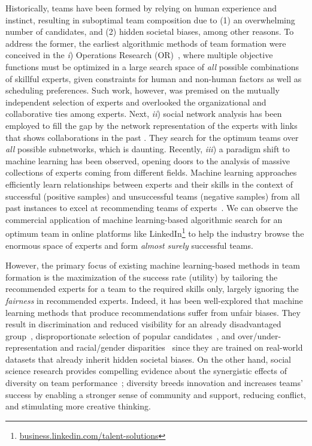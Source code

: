 \documentclass[runningheads]{llncs}
\begin{document}
Historically, teams have been formed by relying on human experience and instinct, resulting in suboptimal team composition due to (1) an overwhelming number of candidates, and (2) hidden societal biases, among other reasons. To address the former, the earliest algorithmic methods of team formation were conceived in the \textit{i}) Operations Research (OR)~\cite{RAHMANNIYAY2019153}, where multiple objective functions must be optimized in a large search space of \textit{all} possible combinations of skillful experts, given constraints for human and non-human factors as well as scheduling preferences. Such work, however, was premised on the mutually independent selection of experts and overlooked the organizational and collaborative ties among experts. Next, \textit{ii}) social network analysis has been employed to fill the gap by the network representation of the experts with links that shows collaborations in the past \cite{DBLP:conf/kdd/LappasLT09,kargar2011discovering,6228185}.  They search for the optimum teams over \textit{all} possible subnetworks, which is daunting. Recently, \textit{iii}) a paradigm shift to machine learning has been observed, opening doors to the analysis of massive collections of experts coming from different fields. Machine learning approaches efficiently learn relationships between experts and their skills in the context of successful (positive samples) and unsuccessful teams (negative samples) from all past instances to excel at recommending teams of experts~\cite{DBLP:conf/cikm/RadMFKSB21,DBLP:conf/cikm/DashtiSF22,DBLP:conf/cikm/RadFKSB20}. We can observe the commercial application of machine learning-based algorithmic search for an optimum team in online platforms like LinkedIn\footnote{\href{https://business.linkedin.com/talent-solutions}{business.linkedin.com/talent-solutions}} to help the industry browse the enormous space of experts and form \textit{almost surely} successful teams.

However, the primary focus of existing machine learning-based methods in team formation is the maximization of the success rate (utility) by tailoring the recommended experts for a team to the required skills only, largely ignoring the \textit{fairness} in recommended experts. Indeed, it has been well-explored that machine learning methods that produce recommendations suffer from unfair biases. They result in discrimination and reduced visibility for an already disadvantaged group~\cite{DBLP:conf/innovations/DworkHPRZ12,DBLP:conf/kdd/HajianBC16}, disproportionate selection of popular candidates~\cite{DBLP:journals/ipm/YalcinB21,DBLP:conf/kdd/Zhu0ZC21,DBLP:conf/kdd/SunGZZRHGTYHC20}, and over/under-representation and racial/gender disparities~\cite{DBLP:conf/chi/KayMM15} since they are trained on real-world datasets that already inherit hidden societal biases. On the other hand, social science research provides compelling evidence about the synergistic effects of diversity on team performance~\cite{tannenbaum2019sex,lauring2019performance,hofstra2020diversity}; diversity breeds innovation and increases teams' success by enabling a stronger sense of community and support, reducing conflict, and stimulating more creative thinking. 
\end{document}
